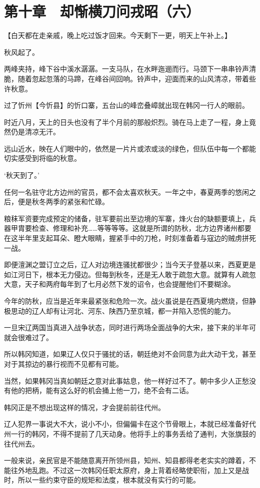 \section{第十章　却惭横刀问戎昭（六）}

【白天都在走亲戚，晚上吃过饭才回来。今天剩下一更，明天上午补上。】

秋风起了。

两峰夹持，峰下谷中溪水潺潺。一支马队，在水畔迤逦而行。马颈下一串串铃声清脆，随着忽起忽落的马蹄，在峰谷间回响。铃声中，迎面而来的山风清凉，带着些许秋意。

过了忻州【今忻县】的忻口寨，五台山的峰峦叠嶂就出现在韩冈一行人的眼前。

时近八月，天上的日头也没有了半个月前的那般炽烈。骑在马上走了一程，身上竟然仍是清凉无汗。

远山近水，映在人们眼中的，依然是一片片或浓或淡的绿色，但队伍中每一个都能切实感受到将临的秋意。

‘秋天到了。’

任何一名驻守北方边州的官员，都不会太喜欢秋天。一年之中，春夏两季的悠闲之后，便是秋冬两季的紧张和忙碌。

粮秣军资要完成预定的储备，驻军要前出至边境的军寨，烽火台的缺额要填上，兵器甲胄要检查、修理和补充……等等等等。这就是所谓的防秋，北方边界诸州都要在这半年里支起耳朵、瞪大眼睛，握紧手中的刀枪，时刻准备着与寇边的贼虏拼死一战。

即便澶渊之盟订立之后，辽人对边境连骚扰都很少；当今天子登基以来，西夏更是如江河日下，根本无力侵边。但每到秋冬，还是无人敢于疏忽大意。就算有人疏忽大意，天子和两府每年到了七月必然下发的诏令，也会提醒他们不要糊涂。

今年的防秋，应当是近年来最紧张和危险一次。战火虽说是在西夏境内燃烧，但静极思动的辽人却有让河北、河东、陕西乃至京城，都一并陷入恐慌的能力。

一旦宋辽两国当真进入战争状态，同时进行两场全面战争的大宋，接下来的半年可就会很难过了。

所以韩冈知道，如果辽人仅只于骚扰的话，朝廷绝对不会同意为此大动干戈，甚至对于其掠边的暴行视而不见都有可能。

当然，如果韩冈当真如朝廷之意对此事姑息，他一样好过不了。朝中多少人正愁没有他的把柄，能有这么好的机会捅上他一刀，绝不会有二话。

韩冈正是不想出现这样的情况，才会提前前往代州。

辽人犯界一事说大不大，说小不小，但偏偏卡在这个节骨眼上，本就已经准备好代州一行的韩冈，不得不提前了几天动身。他将手上的事务丢给了通判，大张旗鼓的往代州去。

一般来说，亲民官是不能随意离开所领州县，知州、知县都得老老实实的蹲着，不能往外地乱跑。不过这一次韩冈任职太原府，身上背着经略使职衔，加上又是战时，所以一些约束守臣的规矩和法度，根本就没有实行的可能。

